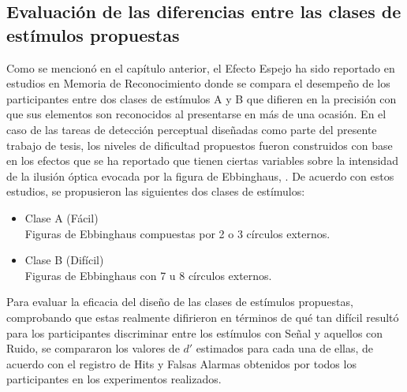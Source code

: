 \subsection{Evaluación de las diferencias entre las clases de estímulos propuestas}


Como se mencionó en el capítulo anterior, el Efecto Espejo ha sido reportado en estudios en Memoria de Reconocimiento donde se compara el desempeño de los participantes entre dos clases de estímulos A y B que difieren en la precisión con que sus elementos son reconocidos al presentarse en más de una ocasión. En el caso de las tareas de detección perceptual diseñadas como parte del presente trabajo de tesis, los niveles de dificultad propuestos fueron construidos con base en los efectos que se ha reportado que tienen ciertas variables sobre la intensidad de la ilusión óptica evocada por la figura de Ebbinghaus, \parencite{Massaro1971}. De acuerdo con estos estudios, se propusieron las siguientes dos clases de estímulos:\\

\begin{itemize}
\item Clase A (Fácil)\\

Figuras de Ebbinghaus compuestas por 2 o 3 círculos externos.\\

\item Clase B (Difícil)\\

Figuras de Ebbinghaus con 7 u 8 círculos externos.\\
\end{itemize}

Para evaluar la eficacia del diseño de las clases de estímulos propuestas, comprobando que estas realmente difirieron en términos de qué tan difícil resultó para los participantes discriminar entre los estímulos con Señal y aquellos con Ruido, se compararon los valores de $d'$ estimados para cada una de ellas, de acuerdo con el registro de Hits y Falsas Alarmas obtenidos por todos los participantes en los experimentos realizados.\\

